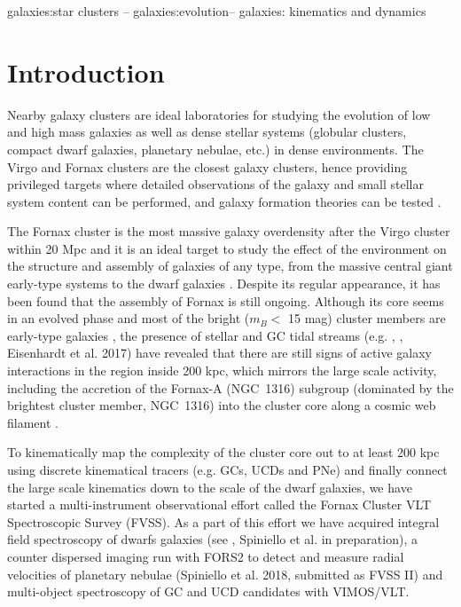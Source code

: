 \documentclass[usenatbib]{mnras}
\begin{document}
\begin{keywords}
galaxies:star clusters -- galaxies:evolution-- galaxies: kinematics and dynamics
\end{keywords}

\section{Introduction}

Nearby galaxy clusters are ideal laboratories for studying the evolution of 
low and high mass galaxies as well as dense stellar systems (globular 
clusters, compact dwarf galaxies, planetary nebulae, etc.) in dense environments. 
The Virgo and Fornax clusters are the closest galaxy clusters, hence providing 
privileged targets where detailed observations of the galaxy and small stellar 
system content can be performed, and galaxy formation theories can be tested \citep[e.g.,][]{Strader11}. 

The Fornax cluster is the most massive galaxy overdensity after the Virgo cluster 
within 20 Mpc and it is an ideal target to study the effect of the environment 
on the structure and assembly of galaxies of any type, from the massive central 
giant early-type systems to the dwarf galaxies \citep[e.g.,][]{Ferguson89, munoz15, Iodice16, venhola17, Eigenthaler18}. Despite its regular appearance, 
it has been found that the assembly of Fornax is still ongoing. 
Although its core seems in an evolved phase \citep{Grillmair94,Jordan07} 
and most of the bright ($m_B < $  15 mag) cluster members are 
early-type galaxies \citep{Ferguson89}, the presence of stellar and GC tidal 
streams (e.g. \citealt{Iodice16}, \citealt{DAbrusco16}, Eisenhardt et al. 
2017) have revealed that there are still signs of active galaxy interactions in 
the region inside 200 kpc, which mirrors the large scale activity, including 
the accretion of the Fornax-A (NGC~1316) subgroup (dominated by the brightest 
cluster member, NGC~1316) into the cluster core along a 
cosmic web filament \citep{Drinkwater00,Scharf05}.

To kinematically map the complexity of the cluster core out to at least 200 kpc 
using discrete kinematical tracers (e.g. GCs, UCDs and PNe) and finally connect the 
large scale kinematics down to the scale of the dwarf galaxies, we have started 
a multi-instrument observational effort called the Fornax Cluster VLT 
Spectroscopic Survey (FVSS). As a part of this effort we have acquired integral 
field spectroscopy of dwarfs galaxies (see \citealt{mentz16}, Spiniello et al. 
in preparation), a counter dispersed imaging run with FORS2 to detect and 
measure radial velocities of planetary nebulae (Spiniello et al. 2018, 
submitted as FVSS II) and multi-object spectroscopy of GC and UCD candidates 
with VIMOS/VLT.
\end{document}
